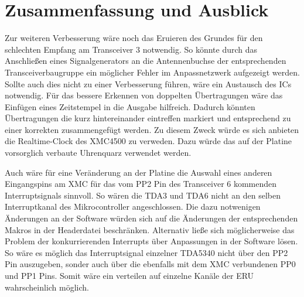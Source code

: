 \chapter{Zusammenfassung und Ausblick}
\label{sec:Zusammenfassung}
\pagestyle{scrheadings}




Zur weiteren Verbesserung wäre noch das Eruieren des Grundes für den schlechten Empfang am Transceiver $3$ notwendig. So könnte durch das Anschließen eines Signalgenerators an die Antennenbuchse der entsprechenden Transceiverbaugruppe ein möglicher Fehler im Anpassnetzwerk aufgezeigt werden. Sollte auch dies nicht zu einer Verbesserung führen, wäre ein Austausch des \acp{IC} notwendig.
Für das bessere Erkennen von doppelten Übertragungen wäre das Einfügen eines Zeitstempel in die Ausgabe hilfreich. Dadurch könnten Übertragungen die kurz hintereinander eintreffen markiert und entsprechend zu einer korrekten zusammengefügt werden. Zu diesem Zweck würde es sich anbieten die Realtime-Clock des XMC4500 zu verweden. Dazu würde das auf der Platine vorsorglich verbaute Uhrenquarz verwendet werden. 


Auch wäre für eine Veränderung an der Platine die Auswahl eines anderen Eingangspins am XMC für das vom PP2 Pin des Transceiver 6 kommenden Interruptsignals sinnvoll. So wären die TDA3 und TDA6 nicht an den selben Interruptkanal des Mikrocontroller angeschlossen. Die dazu notwenigen Änderungen an der Software würden sich auf die Änderungen der entsprechenden Makros in der Headerdatei beschränken.
Alternativ ließe sich möglicherweise das Problem der konkurrierenden Interrupts über Anpassungen in der Software lösen. So wäre es möglich das Interruptsignal einzelner TDA5340 nicht über den PP2 Pin auszugeben, sonder auch über die ebenfalls mit dem XMC verbundenen PP0 und PP1 Pins. Somit wäre ein verteilen auf einzelne Kanäle der \ac{ERU} wahrscheinlich möglich.



